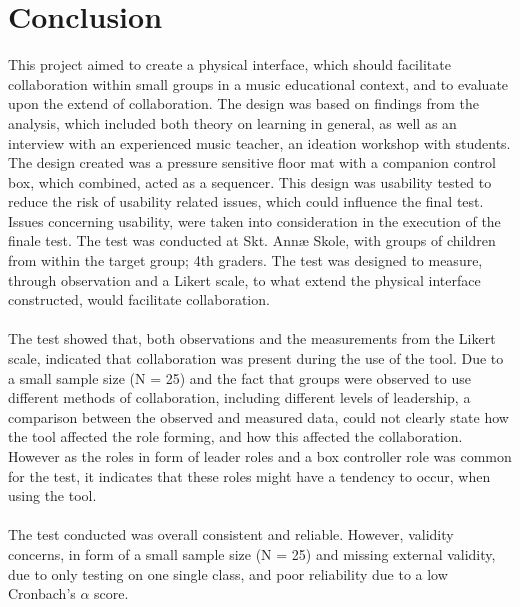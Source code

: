 \chapter{Conclusion}
This project aimed to create a physical interface, which should facilitate collaboration within small groups in a music educational context, and to evaluate upon the extend of collaboration. The design was based on findings from the analysis, which included both theory on learning in general, as well as an interview with an experienced music teacher, an ideation workshop with students. The design created was a pressure sensitive floor mat with a companion control box, which combined, acted as a sequencer. This design was usability tested to reduce the risk of usability related issues, which could influence the final test. Issues concerning usability, were taken into consideration in the execution of the finale test. The test was conducted at Skt. Annæ Skole, with groups of children from within the target group; 4th graders. The test was designed to measure, through observation and a Likert scale,  to what extend the physical interface constructed, would facilitate collaboration.\\\\
The test showed that, both observations and the measurements from the Likert scale, indicated that collaboration was present during the use of the tool. Due to a small sample size (N = 25) and the fact that groups were observed to use different methods of collaboration, including different levels of leadership, a comparison between the observed and measured data, could not clearly state how the tool affected the role forming, and how this affected the collaboration. However as the roles in form of leader roles and a box controller role was common for the test, it indicates that these roles might have a tendency to occur, when using the tool.\\\\
The test conducted was overall consistent and reliable. However, validity concerns, in form of a small sample size (N = 25) and missing external validity, due to only testing on one single class, and poor reliability due to a low Cronbach's $\alpha$ score.